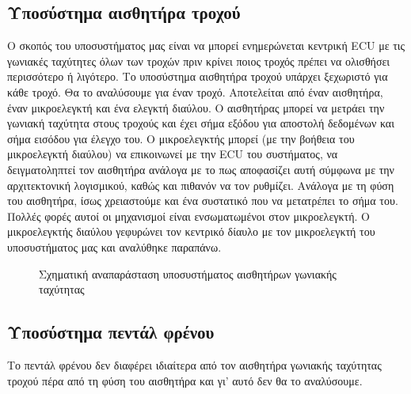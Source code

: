 \documentclass{article}
\begin{document}
\subsection{Υποσύστημα αισθητήρα τροχού}\label{angular-sensors-module}
Ο σκοπός του υποσυστήματος μας είναι να μπορεί ενημερώνεται κεντρική ECU με τις γωνιακές ταχύτητες όλων των τροχών πριν κρίνει ποιος τροχός πρέπει να ολισθήσει περισσότερο ή λιγότερο. Το υποσύστημα αισθητήρα τροχού υπάρχει ξεχωριστό για κάθε τροχό. Θα το αναλύσουμε για έναν τροχό. Αποτελείται από έναν αισθητήρα, έναν μικροελεγκτή και ένα ελεγκτή διαύλου. Ο αισθητήρας μπορεί να μετράει την γωνιακή ταχύτητα στους τροχούς και έχει σήμα εξόδου για αποστολή δεδομένων και σήμα εισόδου για έλεγχο του. Ο μικροελεγκτής μπορεί (με την βοήθεια του μικροελεγκτή διαύλου) να επικοινωνεί με την ECU του συστήματος, να δειγματοληπτεί τον αισθητήρα ανάλογα με το πως αποφασίζει αυτή σύμφωνα με την αρχιτεκτονική λογισμικού, καθώς και πιθανόν να τον ρυθμίζει. Ανάλογα με τη φύση του αισθητήρα, ίσως χρειαστούμε και ένα συστατικό που να μετατρέπει το σήμα του. Πολλές φορές αυτοί οι μηχανισμοί είναι ενσωματωμένοι στον μικροελεγκτή. Ο μικροελεγκτής διαύλου γεφυρώνει τον κεντρικό δίαυλο με τον μικροελεγκτή του υποσυστήματος μας και αναλύθηκε παραπάνω.

\begin{figure}[H]
\caption{Σχηματική αναπαράσταση υποσυστήματος αισθητήρων γωνιακής ταχύτητας}
\label{fig:sensors-module}
\end{figure}

\subsection{Υποσύστημα πεντάλ φρένου}
Το πεντάλ φρένου δεν διαφέρει ιδιαίτερα από τον αισθητήρα γωνιακής ταχύτητας τροχού πέρα από τη φύση του αισθητήρα και γι' αυτό δεν θα το αναλύσουμε.
\end{document}
